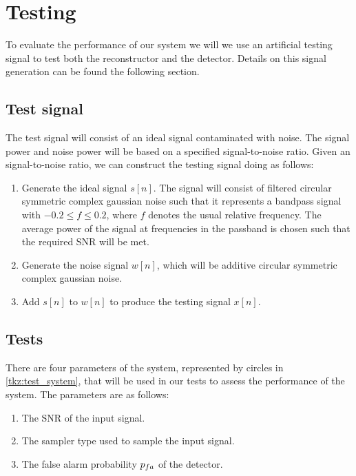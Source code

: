 \documentclass[a4paper, openany, oneside]{memoir}
\begin{document}
\section{Testing}
To evaluate the performance of our system we will we use an artificial testing signal to test both the reconstructor and the detector.
Details on this signal generation can be found the following section.

\subsection{Test signal}\label{ssec:test_signal}
The test signal will consist of an ideal signal contaminated with noise. The signal power and noise power will be based on a specified signal-to-noise ratio. Given an signal-to-noise ratio, we can construct the testing signal doing as follows:

\begin{enumerate}
	\item Generate the ideal signal $s[n]$. The signal will consist of filtered circular symmetric complex gaussian noise such that it represents a bandpass signal with $-0.2 \leq f\leq 0.2$, where $f$ denotes the usual relative frequency. The average power of the signal at frequencies in the passband is chosen such that the required SNR will be met. 
	\item Generate the noise signal $w[n]$, which will be additive circular symmetric complex gaussian noise.
	\item Add $s[n]$ to $w[n]$ to produce the testing signal $x[n]$.
\end{enumerate}

\subsection{Tests}
There are four parameters of the system, represented by circles in \cref{tkz:test_system}, that will be used in our tests to assess the performance of the system. The parameters are as follows:
\begin{enumerate}
	\item The SNR of the input signal.
	\item The sampler type used to sample the input signal.
	\item The false alarm probability $p\ss{fa}$ of the detector.
\end{enumerate}
\end{document}
